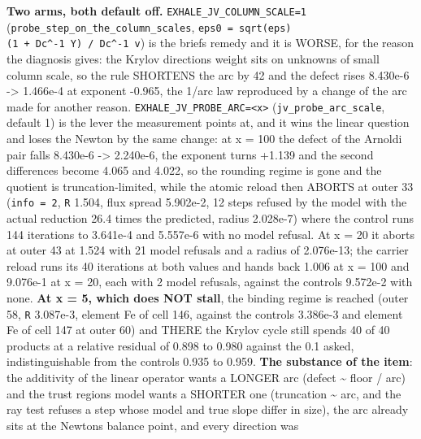 \documentclass[english,a4paper]{my_memo}
\begin{document}
\begin{itemize}
  \textbf{Two arms, both default off.} \texttt{EXHALE\_JV\_COLUMN\_SCALE=1}
  (\texttt{probe\_step\_on\_the\_column\_scales}, \texttt{eps0\ =\ sqrt(eps)(1\ +\ \textbar{}\textbar{}Dc\^{}-1\ Y\textbar{}\textbar{})\ /\ \textbar{}\textbar{}Dc\^{}-1\ v\textbar{}\textbar{}}) is the brief\textquotesingle s remedy and it is WORSE, for the reason the
  diagnosis gives: the Krylov direction\textquotesingle s weight sits on unknowns of small
  column scale, so the rule SHORTENS the arc by 42 and the defect rises
  8.430e-6 -\textgreater{} 1.466e-4 at exponent -0.965, the 1/arc law reproduced by a
  change of the arc made for another reason. \texttt{EXHALE\_JV\_PROBE\_ARC=\textless{}x\textgreater{}}
  (\texttt{jv\_probe\_arc\_scale}, default 1) is the lever the measurement points at,
  and it wins the linear question and loses the Newton by the same change:
  at x = 100 the defect of the Arnoldi pair falls 8.430e-6 -\textgreater{} 2.240e-6, the
  exponent turns +1.139 and the second differences become 4.065 and 4.022,
  so the rounding regime is gone and the quotient is truncation-limited,
  while the atomic reload then ABORTS at outer 33 (\texttt{info\ =\ 2}, \texttt{\textbar{}\textbar{}R\textbar{}\textbar{}}
  1.504, flux spread 5.902e-2, 12 steps refused by the model with the
  actual reduction 26.4 times the predicted, radius 2.028e-7) where the
  control runs 144 iterations to 3.641e-4 and 5.557e-6 with no model
  refusal. At x = 20 it aborts at outer 43 at 1.524 with 21 model
  refusals and a radius of 2.076e-13; the carrier reload runs its 40
  iterations at both values and hands back 1.006 at x = 100 and 9.076e-1
  at x = 20, each with 2 model refusals, against the control\textquotesingle s 9.572e-2
  with none. \textbf{At x = 5, which
  does NOT stall}, the binding regime is reached (outer 58, \texttt{\textbar{}\textbar{}R\textbar{}\textbar{}}
  3.087e-3, element Fe of cell 146, against the control\textquotesingle s 3.386e-3 and
  element Fe of cell 147 at outer 60) and THERE the Krylov cycle still
  spends 40 of 40 products at a relative residual of 0.898 to 0.980
  against the 0.1 asked, indistinguishable from the control\textquotesingle s 0.935 to
  0.959. \textbf{The substance of the item}: the additivity of the linear
  operator wants a LONGER arc (defect \textasciitilde{} floor / arc) and the trust
  region\textquotesingle s model wants a SHORTER one (truncation \textasciitilde{} arc, and the ray test
  refuses a step whose model and true slope differ in size), the arc
  already sits at the Newton\textquotesingle s balance point, and every direction was

\end{itemize}
\end{document}
